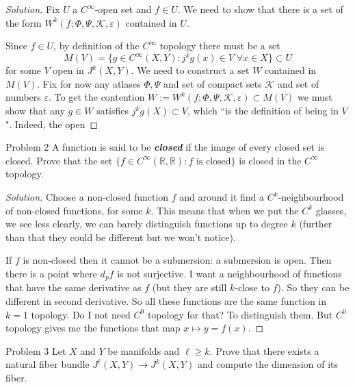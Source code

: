 \begin{proof}[Solution]\leavevmode
Fix \(U\) a \(C^\infty\)-open set and  \(f \in U\). We need to show that there is a set of the form \(W^k(f;\Phi,\Psi,\mathcal{K},\varepsilon)\) contained in \(U\).

Since \(f \in U\), by definition of the \(C^\infty\) topology there must be a set
\[M(V)=\{g \in C^\infty(X,Y): j^kg(x) \in V \;\forall x \in X\} \subset U\]
for some  \(V\) open in \(J^k(X,Y)\). We need to construct a set \(W\) contained in \(M(V)\). Fix for now any atlases  \(\Phi,\Psi\) and set of compact sets \(\mathcal{K}\) and set of numbers \(\varepsilon\). To get the contention \(W:=W^k(f;\Phi,\Psi,\mathcal{K},\varepsilon)\subset M(V)\) we must show that any \(g \in W\) satisfies \(j^kg(X) \subset V\), which ``is the definition of being in \(V\)". Indeed, the open 

\end{proof}

\begin{thing1}{Problem 2}\label{p:2}\leavevmode
A function is said to be \textit{\textbf{closed}} if the image of every closed set is closed. Prove that the set \(\{f \in C^\infty(\mathbb{R},\mathbb{R}): f \text{ is closed} \}\) is closed in the \(C^\infty\) topology.
\end{thing1}

\begin{proof}[Solution]\leavevmode
Choose a non-closed function $f$ and around it find a \(C^k\)-neighbourhood of non-closed functions, for some \(k\). This means that when we put the \(C^k\) glasses, we see less clearly, we can barely distinguish functions up to degree \(k\) (further than that they could be different but we won't notice).

If $f$ is non-closed then it cannot be a submersion: a submersion is open. Then there is a point where \(d_pf\) is not surjective. I want a neighbourhood of functions that have the same derivative as $f$ (but they are still \(k\)-close to $f $). So they can be different in second derivative. So all these functions are the same function in \(k=1\) topology. Do I not need \(C^0\) topology for that? To distinguish them. But \(C^0\) topology gives me the functions that map \(x \mapsto y=f(x)\).
\end{proof}

\begin{thing1}{Problem 3}\label{prob:3}\leavevmode
Let \(X\) and \(Y\) be manifolds and \(\ell \geq  k\). Prove that there exists a natural fiber bundle \(J^\ell(X,Y) \to J^k(X,Y)\) and compute the dimension of its fiber.
\end{thing1}

